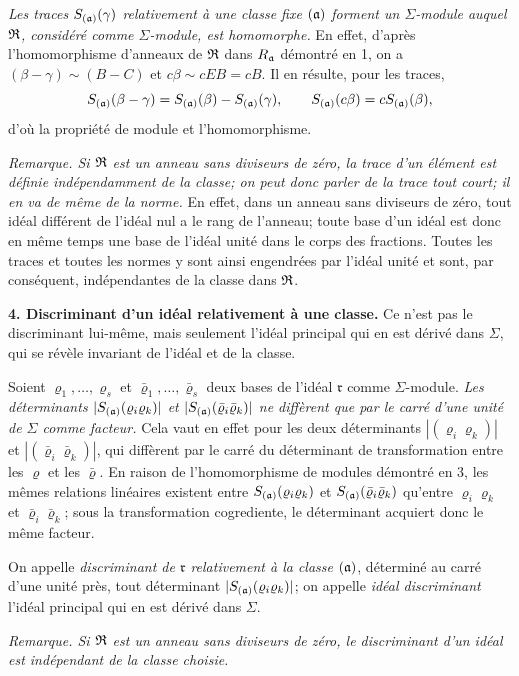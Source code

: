 \emph{Les traces $S_{(\mathfrak a)}(\gamma)$ relativement à une classe fixe $(\mathfrak a)$ forment un $\Sigma$-module auquel $\mathfrak R$, considéré comme $\Sigma$-module, est homomorphe.} En effet, d'après l'homomorphisme d'anneaux de $\mathfrak R$ dans $R_\mathfrak a$ démontré en 1, on a $(\beta-\gamma)\sim(B-C)$ et $c\beta\sim cEB=cB$. Il en résulte, pour les traces,
\[
S_{(\mathfrak a)}(\beta-\gamma)=S_{(\mathfrak a)}(\beta)-S_{(\mathfrak a)}(\gamma),
\qquad
S_{(\mathfrak a)}(c\beta)=cS_{(\mathfrak a)}(\beta),
\]
d'où la propriété de module et l'homomorphisme.

\emph{Remarque. Si $\mathfrak R$ est un anneau sans diviseurs de zéro, la trace d'un élément est définie indépendamment de la classe; on peut donc parler de la trace tout court; il en va de même de la norme.} En effet, dans un anneau sans diviseurs de zéro, tout idéal différent de l'idéal nul a le rang de l'anneau; toute base d'un idéal est donc en même temps une base de l'idéal unité dans le corps des fractions. Toutes les traces et toutes les normes y sont ainsi engendrées par l'idéal unité et sont, par conséquent, indépendantes de la classe dans $\mathfrak R$.

\textbf{4. Discriminant d'un idéal relativement à une classe.} Ce n'est pas le discriminant lui-même, mais seulement l'idéal principal qui en est dérivé dans $\Sigma$, qui se révèle invariant de l'idéal et de la classe.

Soient $\varrho_1,\ldots,\varrho_s$ et $\bar\varrho_1,\ldots,\bar\varrho_s$ deux bases de l'idéal $\mathfrak r$ comme $\Sigma$-module. \emph{Les déterminants $|S_{(\mathfrak a)}(\varrho_i\varrho_k)|$ et $|S_{(\mathfrak a)}(\bar\varrho_i\bar\varrho_k)|$ ne diffèrent que par le carré d'une unité de $\Sigma$ comme facteur.} Cela vaut en effet pour les deux déterminants $|(\varrho_i\varrho_k)|$ et $|(\bar\varrho_i\bar\varrho_k)|$, qui diffèrent par le carré du déterminant de transformation entre les $\varrho$ et les $\bar\varrho$. En raison de l'homomorphisme de modules démontré en 3, les mêmes relations linéaires existent entre $S_{(\mathfrak a)}(\varrho_i\varrho_k)$ et $S_{(\mathfrak a)}(\bar\varrho_i\bar\varrho_k)$ qu'entre $\varrho_i\varrho_k$ et $\bar\varrho_i\bar\varrho_k$; sous la transformation cogrediente, le déterminant acquiert donc le même facteur.

On appelle \emph{discriminant de $\mathfrak r$ relativement à la classe $(\mathfrak a)$}, déterminé au carré d'une unité près, tout déterminant $|S_{(\mathfrak a)}(\varrho_i\varrho_k)|$; on appelle \emph{idéal discriminant} l'idéal principal qui en est dérivé dans $\Sigma$.

\emph{Remarque. Si $\mathfrak R$ est un anneau sans diviseurs de zéro, le discriminant d'un idéal est indépendant de la classe choisie.}

